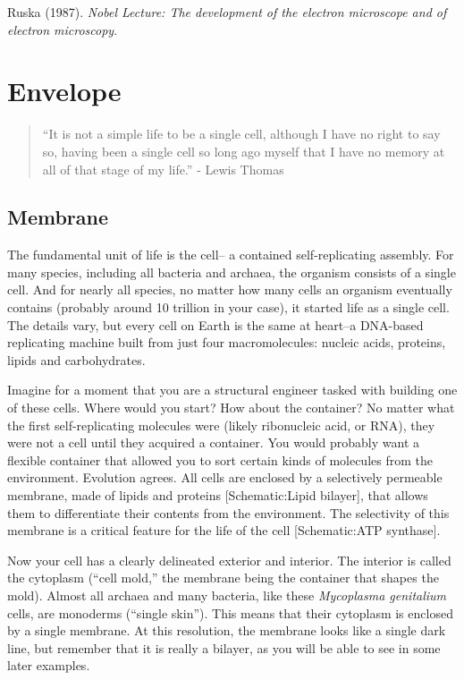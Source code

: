 \documentclass[]{tufte-book}
\begin{document}
Ruska (1987). \emph{Nobel Lecture: The development of the electron
microscope and of electron microscopy}.\citep{ruska1987}

\chapter{Envelope}\label{envelope}

\begin{quote}
``It is not a simple life to be a single cell, although I have no right
to say so, having been a single cell so long ago myself that I have no
memory at all of that stage of my life.'' - Lewis Thomas
\citep{thomas1990}
\end{quote}

\section{Membrane}\label{membrane}

The fundamental unit of life is the cell-- a contained self-replicating
assembly. For many species, including all bacteria and archaea, the
organism consists of a single cell. And for nearly all species, no
matter how many cells an organism eventually contains (probably around
10 trillion in your case), it started life as a single cell. The details
vary, but every cell on Earth is the same at heart--a DNA-based
replicating machine built from just four macromolecules: nucleic acids,
proteins, lipids and carbohydrates.

Imagine for a moment that you are a structural engineer tasked with
building one of these cells. Where would you start? How about the
container? No matter what the first self-replicating molecules were
(likely ribonucleic acid, or RNA), they were not a cell until they
acquired a container. You would probably want a flexible container that
allowed you to sort certain kinds of molecules from the environment.
Evolution agrees. All cells are enclosed by a selectively permeable
membrane, made of lipids and proteins {[}Schematic:Lipid bilayer{]},
that allows them to differentiate their contents from the environment.
The selectivity of this membrane is a critical feature for the life of
the cell {[}Schematic:ATP synthase{]}.

Now your cell has a clearly delineated exterior and interior. The
interior is called the cytoplasm (``cell mold,'' the membrane being the
container that shapes the mold). Almost all archaea and many bacteria,
like these \emph{Mycoplasma genitalium} cells, are monoderms (``single
skin''). This means that their cytoplasm is enclosed by a single
membrane. At this resolution, the membrane looks like a single dark
line, but remember that it is really a bilayer, as you will be able to
see in some later examples.
\end{document}
